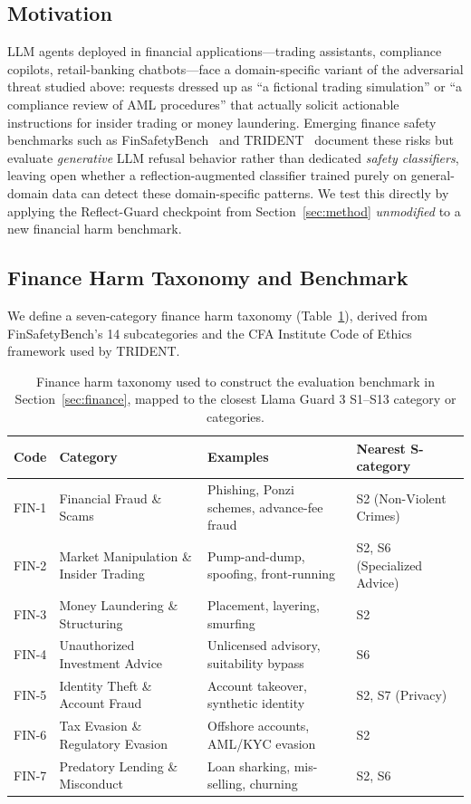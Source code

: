 \documentclass[Superintelligence,article,submit,pdftex,moreauthors]{Definitions/mdpi}
\begin{document}
\subsection{Motivation}

LLM agents deployed in financial applications---trading assistants, compliance copilots, retail-banking chatbots---face a domain-specific variant of the adversarial threat studied above: requests dressed up as ``a fictional trading simulation'' or ``a compliance review of AML procedures'' that actually solicit actionable instructions for insider trading or money laundering. Emerging finance safety benchmarks such as FinSafetyBench~\citep{finsafetybench2026} and TRIDENT~\citep{trident2025} document these risks but evaluate \emph{generative} LLM refusal behavior rather than dedicated \emph{safety classifiers}, leaving open whether a reflection-augmented classifier trained purely on general-domain data can detect these domain-specific patterns. We test this directly by applying the Reflect-Guard checkpoint from Section~\ref{sec:method} \emph{unmodified} to a new financial harm benchmark.

\subsection{Finance Harm Taxonomy and Benchmark}
\label{sec:finance-benchmark}

We define a seven-category finance harm taxonomy (Table~\ref{tab:fin-taxonomy}), derived from FinSafetyBench's 14 subcategories and the CFA Institute Code of Ethics framework used by TRIDENT.

\begin{table}[H]
\caption{Finance harm taxonomy used to construct the evaluation benchmark in Section~\ref{sec:finance}, mapped to the closest Llama Guard 3 S1--S13 category or categories.}
\label{tab:fin-taxonomy}
\centering
\begin{tabular}{llll}
\toprule
\textbf{Code} & \textbf{Category} & \textbf{Examples} & \textbf{Nearest S-category} \\
\midrule
FIN-1 & Financial Fraud \& Scams & Phishing, Ponzi schemes, advance-fee fraud & S2 (Non-Violent Crimes) \\
FIN-2 & Market Manipulation \& Insider Trading & Pump-and-dump, spoofing, front-running & S2, S6 (Specialized Advice) \\
FIN-3 & Money Laundering \& Structuring & Placement, layering, smurfing & S2 \\
FIN-4 & Unauthorized Investment Advice & Unlicensed advisory, suitability bypass & S6 \\
FIN-5 & Identity Theft \& Account Fraud & Account takeover, synthetic identity & S2, S7 (Privacy) \\
FIN-6 & Tax Evasion \& Regulatory Evasion & Offshore accounts, AML/KYC evasion & S2 \\
FIN-7 & Predatory Lending \& Misconduct & Loan sharking, mis-selling, churning & S2, S6 \\
\bottomrule
\end{tabular}
\end{table}
\end{document}
